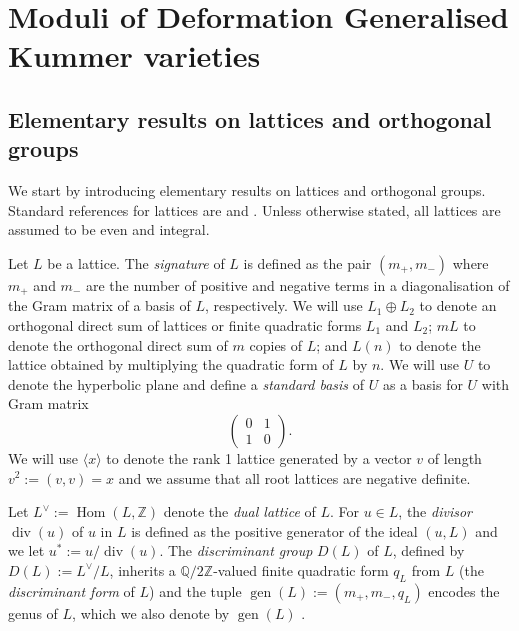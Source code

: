 \documentclass[12pt, a4paper]{article}
\newcommand{\ZZ}{\mathbb{Z}}
\newcommand{\QQ}{\mathbb{Q}}
\newcommand{\la}{\langle}
\newcommand{\ra}{\rangle}
\newcommand{\opn}{\operatorname}
\newcommand{\op}{\oplus}
\newcommand{\bpm}{\begin{pmatrix}}
\newcommand{\epm}{\end{pmatrix}}
\begin{document}
 \section{Moduli of Deformation Generalised Kummer varieties}\label{modulisec}
\subsection{Elementary results on lattices and orthogonal groups}
We start by introducing elementary results on lattices and orthogonal groups.
Standard references for lattices are \cite{SPLAG} and \cite{Nikulin}.
Unless otherwise stated, all lattices are assumed to be even and integral.


Let $L$ be a lattice.
The \emph{signature} of $L$ is defined as the pair $(m_+, m_-)$ where $m_+$ and $m_-$ are the number of positive and negative terms in a diagonalisation of the Gram matrix of a basis of $L$, respectively.
We will use $L_1 \op L_2$ to denote an orthogonal direct sum of lattices or finite quadratic forms $L_1$ and $L_2$;
$mL$ to denote the orthogonal direct sum of $m$ copies of $L$;
and $L(n)$ to denote the lattice obtained by multiplying the quadratic form of $L$ by $n$.
We will use $U$ to denote the hyperbolic plane and define a \emph{standard basis} of $U$ as a basis for $U$ with Gram matrix 
\[
\bpm
0 & 1 \\
1 & 0
\epm.
\]
We will use $\la x \ra$ to denote the rank 1 lattice generated by a vector $v$ of length $v^2:=(v,v)=x$ and we assume that all root lattices are negative definite. 


Let $L^{\vee}:=\opn{Hom}(L, \ZZ)$ denote the \emph{dual lattice} of $L$.
For $u \in L$, the \emph{divisor} $\opn{div}(u)$ of $u$ in $L$ is defined as the positive generator of the ideal $(u, L)$ and we let  $u^*:=u/\opn{div}(u)$.
The \emph{discriminant group} $D(L)$ of $L$, defined by $D(L) := L^{\vee} / L$, inherits a  $\QQ/2 \ZZ$-valued finite quadratic form $q_L$ from $L$ (the \emph{discriminant form} of $L$) and the tuple $\opn{gen}(L) := (m_+, m_-, q_L)$  encodes the genus of $L$, which we also denote by $\opn{gen}(L)$ \cite{Nikulin}. 
\end{document}
